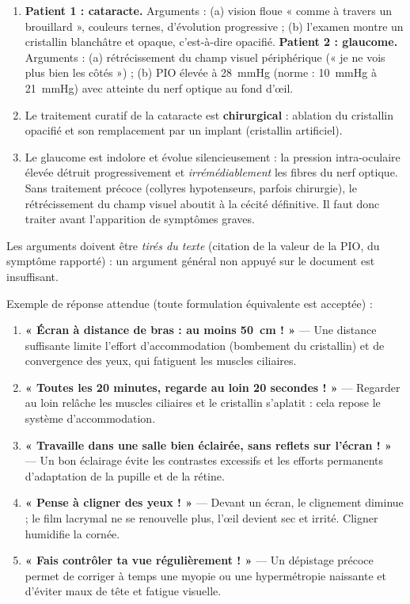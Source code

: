 \documentclass[11pt]{article}
\begin{document}
\begin{corrige}
\begin{enumerate}
\item \textbf{Patient 1 : cataracte.} Arguments : (a) vision floue « comme à travers un brouillard », couleurs ternes, d'évolution progressive ; (b) l'examen montre un cristallin blanchâtre et opaque, c'est-à-dire opacifié. \textbf{Patient 2 : glaucome.} Arguments : (a) rétrécissement du champ visuel périphérique (« je ne vois plus bien les côtés ») ; (b) PIO élevée à \SI{28}{mmHg} (norme : \SI{10}{mmHg} à \SI{21}{mmHg}) avec atteinte du nerf optique au fond d'œil.
\item Le traitement curatif de la cataracte est \textbf{chirurgical} : ablation du cristallin opacifié et son remplacement par un implant (cristallin artificiel).
\item Le glaucome est indolore et évolue silencieusement : la pression intra-oculaire élevée détruit progressivement et \emph{irrémédiablement} les fibres du nerf optique. Sans traitement précoce (collyres hypotenseurs, parfois chirurgie), le rétrécissement du champ visuel aboutit à la cécité définitive. Il faut donc traiter avant l'apparition de symptômes graves.
\end{enumerate}
\end{corrige}

\begin{attention}
Les arguments doivent être \emph{tirés du texte} (citation de la valeur de la PIO, du symptôme rapporté) : un argument général non appuyé sur le document est insuffisant.
\end{attention}

\begin{corrige}
Exemple de réponse attendue (toute formulation équivalente est acceptée) :
\begin{enumerate}
\item \textbf{« Écran à distance de bras : au moins \SI{50}{cm} ! »} — Une distance suffisante limite l'effort d'accommodation (bombement du cristallin) et de convergence des yeux, qui fatiguent les muscles ciliaires.
\item \textbf{« Toutes les 20 minutes, regarde au loin 20 secondes ! »} — Regarder au loin relâche les muscles ciliaires et le cristallin s'aplatit : cela repose le système d'accommodation.
\item \textbf{« Travaille dans une salle bien éclairée, sans reflets sur l'écran ! »} — Un bon éclairage évite les contrastes excessifs et les efforts permanents d'adaptation de la pupille et de la rétine.
\item \textbf{« Pense à cligner des yeux ! »} — Devant un écran, le clignement diminue ; le film lacrymal ne se renouvelle plus, l'œil devient sec et irrité. Cligner humidifie la cornée.
\item \textbf{« Fais contrôler ta vue régulièrement ! »} — Un dépistage précoce permet de corriger à temps une myopie ou une hypermétropie naissante et d'éviter maux de tête et fatigue visuelle.
\end{enumerate}
\end{corrige}
\end{document}
